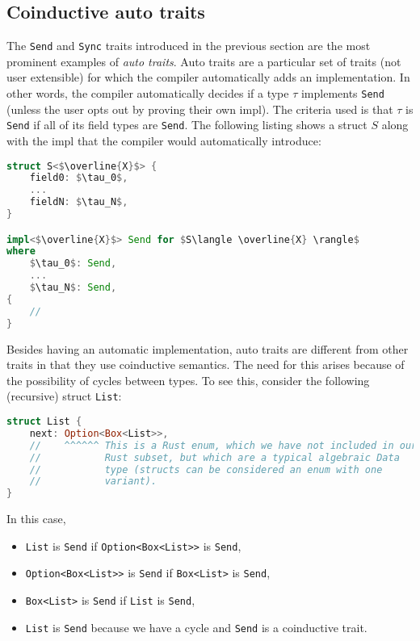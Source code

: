 \documentclass[sn-mathphys-num]{sn-jnl}%
\newcommand{\code}[1]{{\tt #1}}
\theoremstyle{thmstyleone}%
\theoremstyle{thmstyletwo}%
\theoremstyle{thmstylethree}%
\begin{document}
\subsection{Coinductive auto traits}

The \code{Send} and \code{Sync} traits introduced in the previous section
are the most prominent examples of \emph{auto traits}.
Auto traits are a particular set of traits (not user extensible)
for which the compiler automatically adds an implementation.
In other words, the compiler automatically decides if a type $\tau$ implements \code{Send}
(unless the user opts out by proving their own impl).
The criteria used is that $\tau$ is \code{Send} if all of its field types are \code{Send}.
The following listing shows a struct $S$ along with the impl that the compiler would automatically introduce:

\begin{lstlisting}[language=Rust]
struct S<$\overline{X}$> {
    field0: $\tau_0$,
    ...
    fieldN: $\tau_N$,
}

impl<$\overline{X}$> Send for $S\langle \overline{X} \rangle$
where
    $\tau_0$: Send,
    ...
    $\tau_N$: Send,
{
    // 
}
\end{lstlisting}

Besides having an automatic implementation, auto traits are different from other traits in that they use coinductive semantics.
The need for this arises because of the possibility of cycles between types.
To see this, consider the following (recursive) struct \code{List}:

\begin{lstlisting}[language=Rust]
struct List {
    next: Option<Box<List>>,
    //    ^^^^^^ This is a Rust enum, which we have not included in our
    //           Rust subset, but which are a typical algebraic Data
    //           type (structs can be considered an enum with one
    //           variant).
}    
\end{lstlisting}

In this case,

\begin{itemize}
    \item \code{List} is \code{Send} if \code{Option<Box<List>>} is \code{Send},
    \item \code{Option<Box<List>>} is \code{Send} if \code{Box<List>} is \code{Send},
    \item \code{Box<List>} is \code{Send} if \code{List} is \code{Send},
    \item \code{List} is \code{Send} because we have a cycle and \code{Send} is a coinductive trait.
\end{itemize}
\end{document}
